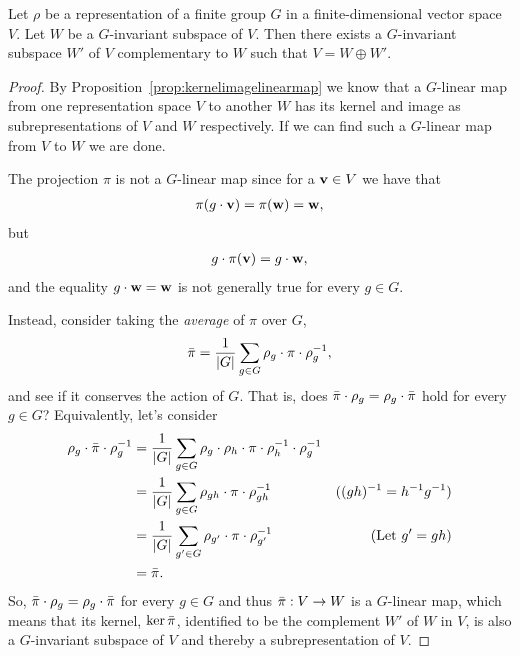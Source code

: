 \begin{proposition}\label{prop:complsubrepr}
	Let $\rho$ be a representation of a finite group $G$ in a finite-dimensional vector space $V$. Let $W$ be a $G$-invariant subspace of $V$. Then there exists a $G$-invariant subspace $W'$ of $V$ complementary to $W$ such that $V = W \oplus W'$.
\end{proposition}
\begin{proof}
	By Proposition~\ref{prop:kernelimagelinearmap} we know that a $G$-linear map from one representation space $V$ to another $W$ has its kernel and image as subrepresentations of $V$ and $W$ respectively. If we can find such a $G$-linear map from $V$ to $W$ we are done.
	
	The projection $\pi$ is not a $G$-linear map since for a $\mathbf{v} \in V$ we have that 
	\begin{align*}
		\pi(g \cdot \mathbf{v}) = \pi(\mathbf{w}) = \mathbf{w},
	\end{align*}
	but 
	\begin{align*}
		g \cdot \pi(\mathbf{v}) = g \cdot \mathbf{w},
	\end{align*}
	and the equality $g \cdot \mathbf{w} = \mathbf{w}$ is not generally true for every $g \in G$.
	
	Instead, consider taking the \textit{average} of $\pi$ over $G$,
	\begin{align*}
		\bar{\pi} = \frac{1}{|G|} \sum_{g \in G} \rho_g \cdot \pi \cdot \rho_g^{-1},
	\end{align*}
	and see if it conserves the action of $G$. That is, does $\bar{\pi}\cdot \rho_g = \rho_g \cdot \bar{\pi}$ hold for every $g \in G$? Equivalently, let's consider
	\begin{align*}
		\rho_g \cdot \bar{\pi} \cdot \rho_g^{-1} &= \frac{1}{|G|} \sum_{g \in G} \rho_g \cdot \rho_h \cdot \pi \cdot \rho_h^{-1} \cdot \rho_g^{-1} \\
		&= \frac{1}{|G|} \sum_{g \in G} \rho_{gh} \cdot \pi \cdot \rho_{gh}^{-1} & \text{($(gh)^{-1}=h^{-1}g^{-1}$)}\\
		&= \frac{1}{|G|} \sum_{g' \in G} \rho_{g'} \cdot \pi \cdot \rho_{g'}^{-1} & \text{(Let $g' = gh$)} \\
		&= \bar{\pi}.
	\end{align*}
	So, $\bar{\pi} \cdot \rho_g = \rho_g \cdot \bar{\pi}$ for every $g \in G$ and thus $\bar{\pi}: V \rightarrow W$ is a $G$-linear map, which means that its kernel, $\ker \bar{\pi}$, identified to be the complement $W'$ of $W$ in $V$, is also a $G$-invariant subspace of $V$ and thereby a subrepresentation of $V$.
\end{proof}

